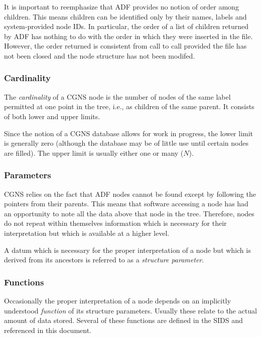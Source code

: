 It is important to reemphasize that ADF provides no notion of order
among children. This means children can be identified only by their
names, labels and system-provided node IDs. In particular, the order
of a list of children returned by ADF has nothing to do with the order
in which they were inserted in the file. However, the order returned is
consistent from call to call provided the file has not been closed and
the node structure has not been modifed.

\subsubsection{Cardinality}
\label{s:cardinality}

The \emph{cardinality} of a CGNS node is the number of nodes of the same
label permitted at one point in the tree, i.e., as children of the same
parent. It consists of both lower and upper limits.

Since the notion of a CGNS database allows for work in progress, the
lower limit is generally zero (although the database may be of little
use until certain nodes are filled). The upper limit is usually either
one or many ($N$).

\subsubsection{Parameters}

CGNS relies on the fact that ADF nodes cannot be found except by
following the pointers from their parents.  This means that software
accessing a node has had an opportunity to note all the data above that
node in the tree. Therefore, nodes do not repeat within themselves
information which is necessary for their interpretation but which is
available at a higher level.

A datum which is necessary for the proper interpretation of a
node but which is derived from its ancestors is referred to as a
\textit{structure parameter}.

\subsubsection{Functions}
\label{s:functions}

Occasionally the proper interpretation of a node depends on
an implicitly understood \emph{function} of its structure
parameters. Usually these relate to the actual amount of data
stored. Several of these functions are defined in the SIDS and
referenced in this document.

